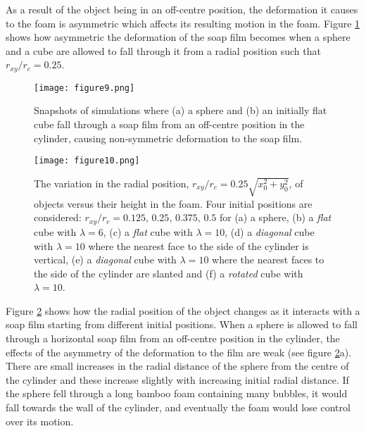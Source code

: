 \documentclass[preprint]{revtex4-1}
\begin{document}
As a result of the object being in an off-centre position, the deformation it causes to the foam is asymmetric which affects its resulting motion in the foam. Figure \ref{fig:offcentre} shows how asymmetric the deformation of the soap film becomes when a sphere and a cube are allowed to fall through it from a radial position such that $r_{xy}/r_c=0.25$. 

\begin{figure}
    \centering
\texttt{[image: figure9.png]}
		\caption{Snapshots of simulations where (a) a sphere and (b) an initially flat cube fall through a soap film from an off-centre position in the cylinder, causing non-symmetric deformation to the soap film.}
			\label{fig:offcentre}
	\end{figure}

\begin{figure}
\centering
\texttt{[image: figure10.png]}
	\caption{The variation in the radial position, $r_{xy}/r_c=0.25\sqrt{x_0^2+y_0^2}$, of objects versus their height in the foam. Four initial positions are considered: $r_{xy}/r_c=0.125,\,0.25,\,0.375,\,0.5$ for (a) a sphere, (b) a \emph{flat} cube with $\lambda=6$, (c) a \emph{flat} cube with $\lambda=10$, (d) a \emph{diagonal} cube with $\lambda=10$ where the nearest face to the side of the cylinder is vertical, (e) a \emph{diagonal} cube with $\lambda=10$ where the nearest faces to the side of the cylinder are slanted and (f) a \emph{rotated} cube with $\lambda=10$.}
	\label{fig:initial_pos_shapes}
\end{figure}



Figure \ref{fig:initial_pos_shapes} shows how the radial position of the object changes as it interacts with a soap film starting from different initial positions. When a sphere is allowed to fall through a horizontal soap film from an off-centre position in the cylinder, the effects of the asymmetry of the deformation to the film are weak (see figure \ref{fig:initial_pos_shapes}a). There are small increases in the radial distance of the sphere from the centre of the cylinder and these increase slightly with increasing initial radial distance. If the sphere fell through a long bamboo foam containing many bubbles, it would fall towards the wall of the cylinder, and eventually the foam would lose control over its motion. 
\end{document}
